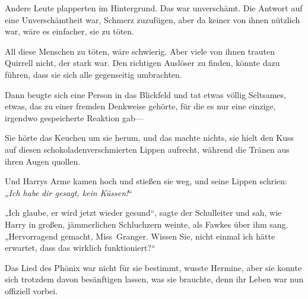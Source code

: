Andere Leute plapperten im Hintergrund. Das war unverschämt. Die Antwort auf eine Unverschämtheit war, Schmerz zuzufügen, aber da keiner von ihnen nützlich war, wäre es einfacher, sie zu töten.

All diese Menschen zu töten, wäre schwierig. Aber viele von ihnen trauten Quirrell nicht, der stark war. Den richtigen Auslöser zu finden, könnte dazu führen, dass sie sich alle gegenseitig umbrachten.

Dann beugte sich eine Person in das Blickfeld und tat etwas völlig Seltsames, etwas, das zu einer fremden Denkweise gehörte, für die es nur eine einzige, irgendwo gespeicherte Reaktion gab—

\later

Sie hörte das Keuchen um sie herum, und das machte nichts, sie hielt den Kuss auf diesen schokoladenverschmierten Lippen aufrecht, während die Tränen aus ihren Augen quollen.

Und Harrys Arme kamen hoch und stießen sie weg, und seine Lippen schrien: „\emph{Ich habe dir gesagt, kein Küssen!}“

\later

„Ich glaube, er wird jetzt wieder gesund“, sagte der Schulleiter und sah, wie Harry in großen, jämmerlichen Schluchzern weinte, als Fawkes über ihm sang. „Hervorragend gemacht, Miss~Granger. Wissen Sie, nicht einmal ich hätte erwartet, dass das wirklich funktioniert?“

Das Lied des Phönix war nicht für sie bestimmt, wusste Hermine, aber sie konnte sich trotzdem davon besänftigen lassen, was sie brauchte, denn ihr Leben war nun offiziell vorbei.

